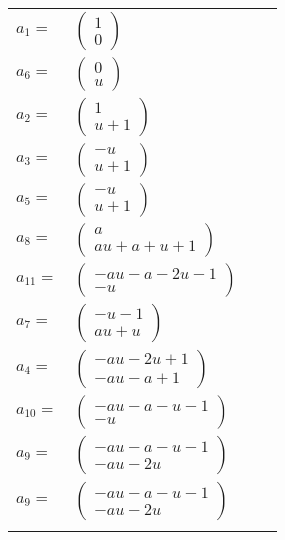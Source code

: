 \documentclass[1p]{elsarticle_modified}
\theoremstyle{definition}
\begin{document}
\begin{tabular}{m{7pt} m{180pt} m{7pt} m{180pt} }
\flushright $a_{1}=$&$\begin{pmatrix}1\\0\end{pmatrix}$ \\
\flushright $a_{6}=$&$\begin{pmatrix}0\\u\end{pmatrix}$ \\
\flushright $a_{2}=$&$\begin{pmatrix}1\\u+1\end{pmatrix}$ \\
\flushright $a_{3}=$&$\begin{pmatrix}- u\\u+1\end{pmatrix}$ \\
\flushright $a_{5}=$&$\begin{pmatrix}- u\\u+1\end{pmatrix}$ \\
\flushright $a_{8}=$&$\begin{pmatrix}a\\a u+a+u+1\end{pmatrix}$ \\
\flushright $a_{11}=$&$\begin{pmatrix}- a u- a-2 u-1\\- u\end{pmatrix}$ \\
\flushright $a_{7}=$&$\begin{pmatrix}- u-1\\a u+u\end{pmatrix}$ \\
\flushright $a_{4}=$&$\begin{pmatrix}- a u-2 u+1\\- a u- a+1\end{pmatrix}$ \\
\flushright $a_{10}=$&$\begin{pmatrix}- a u- a- u-1\\- u\end{pmatrix}$ \\
\flushright $a_{9}=$&$\begin{pmatrix}- a u- a- u-1\\- a u-2 u\end{pmatrix}$\\ \flushright $a_{9}=$&$\begin{pmatrix}- a u- a- u-1\\- a u-2 u\end{pmatrix}$\\&\end{tabular}
\end{document}
